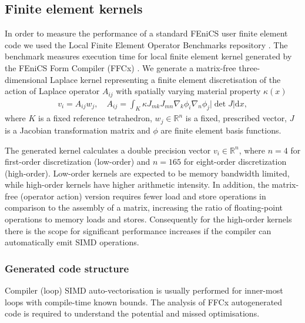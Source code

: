 \subsection*{Finite element kernels}

In order to measure the performance of a standard FEniCS user finite element
code we used the Local Finite Element Operator Benchmarks repository
\citep{Baratta2023}. The benchmark measures execution time for local finite
element kernel generated by the FEniCS Form Compiler (FFCx)
\citep{kirby_compiler_2006}. We generate a matrix-free three-dimensional
Laplace kernel representing a finite element discretisation of the action of
Laplace operator $A_{ij}$ with spatially varying material property $\kappa(x)$
\begin{align}
    v_i = A_{ij} w_j, \quad
    A_{ij} = \int_K \kappa J_{mk} J_{mn} \nabla_k \phi_i \nabla_n \phi_j |\det J| \mathrm dx,
\end{align}
where $K$ is a fixed reference tetrahedron, $w_j \in \mathbb{R}^{n}$ is a
fixed, prescribed vector, $J$ is a Jacobian transformation matrix and $\phi$
are finite element basis functions.

The generated kernel calculates a double precision vector $v_i \in
\mathbb{R}^{n}$, where $n = 4$ for first-order discretization (low-order) and
$n = 165$ for eight-order discretization (high-order). Low-order kernels are
expected to be memory bandwidth limited, while high-order kernels have higher
arithmetic intensity. In addition, the matrix-free (operator action) version
requires fewer load and store operations in comparison to the assembly of a
matrix, increasing the ratio of floating-point operations to memory loads and
stores. Consequently for the high-order kernels there is the scope for
significant performance increases if the compiler can automatically emit SIMD
operations.

\subsubsection*{Generated code structure}

Compiler (loop) SIMD auto-vectorisation is usually performed for inner-most
loops with compile-time known bounds. The analysis of FFCx autogenerated code
is required to understand the potential and missed optimisations.

